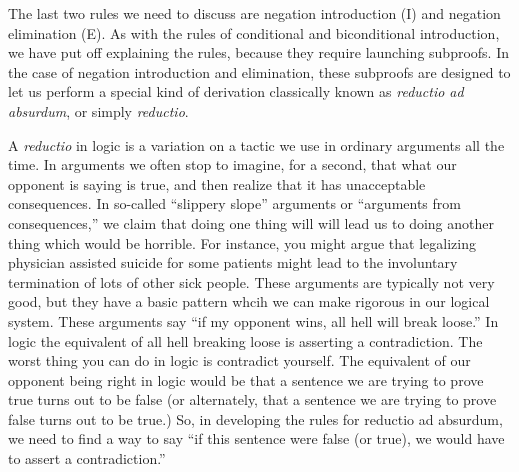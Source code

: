 
The last two rules we need to discuss are negation introduction (\enot I)  and negation elimination (\enot E). As with the rules of conditional and biconditional introduction, we have put off explaining the rules, because they require launching subproofs. In the case of negation introduction and elimination, these subproofs are designed to let us perform a special kind of derivation classically known as \emph{reductio ad absurdum}, or simply \emph{reductio}. 

A \emph{reductio} in logic is a variation on a tactic we use in ordinary arguments all the time. In arguments we often stop to imagine, for a second, that what our opponent is saying is true, and then realize that it has unacceptable consequences. In so-called ``slippery slope'' arguments or ``arguments from consequences,'' we claim that doing one thing will will lead us to doing another thing which would be horrible. For instance, you might argue that legalizing physician assisted suicide for some patients might lead to the involuntary termination of lots of other sick people. These arguments are typically not very good, but they have a basic pattern whcih we can make rigorous  in our logical system. These arguments say ``if my opponent wins, all hell will break loose.'' In logic the equivalent of all hell breaking loose is asserting a contradiction. The worst thing you can do in logic is contradict yourself. The equivalent of our opponent being right in logic would be that a sentence we are trying to prove true turns out to be false (or alternately, that a sentence we are trying to prove false turns out to be true.) So, in developing the rules for reductio ad absurdum, we need to find a way to say ``if this sentence were false (or true), we would have to assert a contradiction.'' 

%

